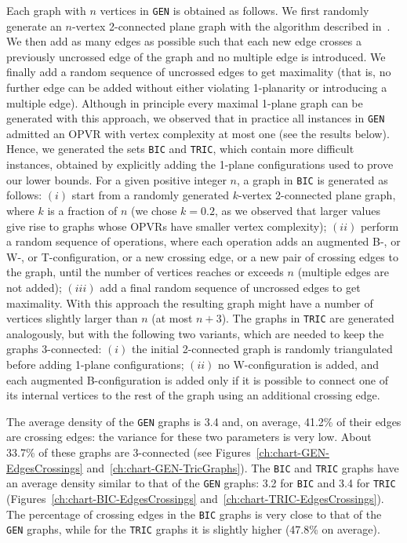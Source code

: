 \documentclass{article}
\newcommand{\opvr}{OPVR\xspace}
\begin{document}
Each graph with $n$ vertices in {\tt GEN} is obtained as follows. We first randomly generate an $n$-vertex 2-connected plane graph with the algorithm described in~\cite{DBLP:journals/tc/BertolazziBD00}. We then add as many edges as possible such that each new edge crosses a previously uncrossed edge of the graph and no multiple edge is introduced. We finally add a random sequence of uncrossed edges to get maximality (that is, no further edge can be added without either violating 1-planarity or introducing a multiple edge). Although in principle every maximal 1-plane graph can be generated with this approach, we observed that in practice all instances in {\tt GEN} admitted an \opvr with vertex complexity at most one (see the results below). Hence, we generated the sets {\tt BIC} and {\tt TRIC}, which contain more difficult instances, obtained by explicitly adding the 1-plane configurations used to prove our lower bounds. For a given positive integer $n$, a graph in {\tt BIC} is generated as follows: $(i)$ start from a randomly generated $k$-vertex 2-connected plane graph, where $k$ is a fraction of $n$ (we chose $k = 0.2$, as we observed that larger values give rise to graphs whose {\opvr}s have smaller vertex complexity); $(ii)$ perform a random sequence of operations, where each operation adds an augmented B-, or W-, or T-configuration, or a new crossing edge, or a new pair of crossing edges to the graph, until the number of vertices reaches or exceeds $n$ (multiple edges are not added); $(iii)$ add a final random sequence of uncrossed edges to get maximality. With this approach the resulting graph might have a number of vertices slightly larger than $n$ (at most $n+3$). The graphs in {\tt TRIC} are generated analogously, but with the following two variants, which are needed to keep the graphs 3-connected: $(i)$ the initial 2-connected graph is randomly triangulated before adding 1-plane configurations; $(ii)$ no W-configuration is added, and each augmented B-configuration is added only if it is possible to connect one of its internal vertices to the rest of the graph using an additional crossing edge. 

The average density of the {\tt GEN} graphs is 3.4 and, on average, 41.2\% of their edges are crossing edges: the variance for these two parameters is very low. About 33.7\% of these graphs are 3-connected (see Figures~\ref{ch:chart-GEN-EdgesCrossings} and~\ref{ch:chart-GEN-TricGraphs}). The {\tt BIC} and {\tt TRIC} graphs have an average density similar to that of the {\tt GEN} graphs: 3.2 for {\tt BIC} and 3.4 for {\tt TRIC} (Figures~\ref{ch:chart-BIC-EdgesCrossings} and~\ref{ch:chart-TRIC-EdgesCrossings}). The percentage of crossing edges in the {\tt BIC} graphs is very close to that of the {\tt GEN} graphs, while for the {\tt TRIC} graphs it is slightly higher (47.8\% on  average).
 
\end{document}
